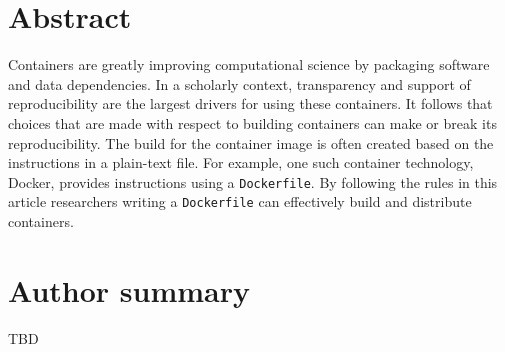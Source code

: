 \documentclass[10pt,letterpaper]{article}
\newcommand{\getIndex}[2]{
  \ForEach{,}{\IfEq{#1}{\thislevelitem}{\number\thislevelcount\ExitForEach}{}}{#2}
}
\newcommand{\getAff}[1]{
  \getIndex{#1}{}
}
\begin{document}
\vspace*{0.2in}

\section*{Abstract}
Containers are greatly improving computational science by packaging
software and data dependencies. In a scholarly context, transparency and
support of reproducibility are the largest drivers for using these
containers. It follows that choices that are made with respect to
building containers can make or break its reproducibility. The build for
the container image is often created based on the instructions in a
plain-text file. For example, one such container technology, Docker,
provides instructions using a \texttt{Dockerfile}. By following the
rules in this article researchers writing a \texttt{Dockerfile} can
effectively build and distribute containers.

\section*{Author summary}
TBD
\end{document}
